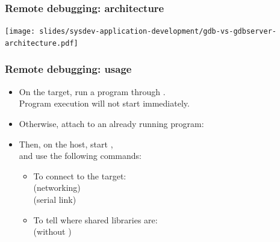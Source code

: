 \begin{frame}
  \frametitle{Remote debugging: architecture}
  \begin{center}
    \texttt{[image: slides/sysdev-application-development/gdb-vs-gdbserver-architecture.pdf]}
  \end{center}
\end{frame}

\begin{frame}
  \frametitle{Remote debugging: usage}
  \begin{itemize}
  \item On the target, run a program through .\\
    Program execution will not start immediately.\\
  \item Otherwise, attach  to an already running program:\\
  \item Then, on the host, start ,\\
    and use the following  commands:
    \begin{itemize}
    \item To connect to the target:\\
       (networking)\\
       (serial link)
    \item To tell  where shared libraries are:\\
       (without )
    \end{itemize}
  \end{itemize}
\end{frame}


